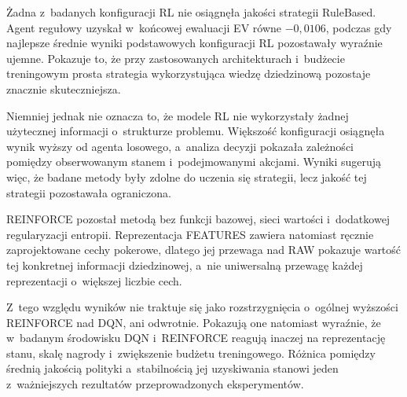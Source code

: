 Żadna z~badanych konfiguracji RL nie osiągnęła jakości strategii
RuleBased. Agent regułowy uzyskał w~końcowej ewaluacji EV równe
$-0{,}0106$, podczas gdy najlepsze średnie wyniki podstawowych
konfiguracji RL pozostawały wyraźnie ujemne. Pokazuje to, że przy
zastosowanych architekturach i~budżecie treningowym
prosta strategia wykorzystująca wiedzę dziedzinową pozostaje
znacznie skuteczniejsza.

Niemniej jednak nie oznacza to, że modele RL nie wykorzystały żadnej
użytecznej informacji o~strukturze problemu. Większość konfiguracji
osiągnęła wynik wyższy od agenta losowego, a~analiza decyzji pokazała
zależności pomiędzy obserwowanym stanem i~podejmowanymi akcjami. Wyniki
sugerują więc, że badane metody były zdolne do uczenia się strategii,
lecz jakość tej strategii pozostawała ograniczona.

REINFORCE
pozostał metodą bez funkcji bazowej, sieci wartości i~dodatkowej regularyzacji
entropii. Reprezentacja FEATURES zawiera natomiast ręcznie
zaprojektowane cechy pokerowe, dlatego jej przewaga nad RAW pokazuje
wartość tej konkretnej informacji dziedzinowej, a~nie uniwersalną
przewagę każdej reprezentacji o~większej liczbie cech.

Z~tego względu wyników nie traktuje się jako rozstrzygnięcia o~ogólnej
wyższości REINFORCE nad DQN, ani odwrotnie. Pokazują one natomiast
wyraźnie, że w~badanym środowisku DQN i~REINFORCE reagują inaczej na
reprezentację stanu, skalę nagrody i~zwiększenie budżetu treningowego.
Różnica pomiędzy średnią jakością polityki a~stabilnością jej
uzyskiwania stanowi jeden z~ważniejszych rezultatów przeprowadzonych
eksperymentów.
